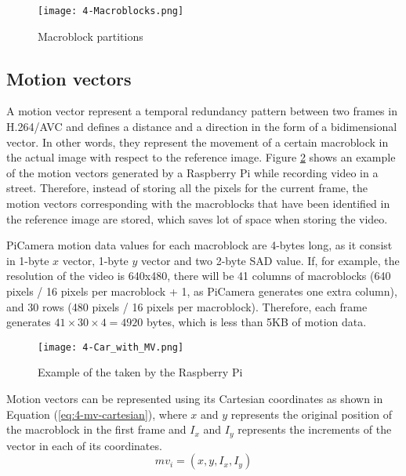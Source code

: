 \begin{figure}[!h]
	\begin{center}
		\texttt{[image: 4-Macroblocks.png]}
		\caption{Macroblock partitions}
		\label{fig:4-Macroblocks}
	\end{center}
\end{figure}


\subsection{Motion vectors}
A motion vector represent a temporal redundancy pattern between two frames in H.264/AVC and defines a distance and a direction in the form of a bidimensional vector. In other words, they represent the movement of a certain macroblock in the actual image with respect to the reference image. Figure \ref{fig:4-Car_with_MV} shows an example of the motion vectors generated by a Raspberry Pi while recording video in a street. Therefore, instead of storing all the pixels for the current frame, the motion vectors corresponding with the macroblocks that have been identified in the reference image are stored, which saves lot of space when storing the video.

PiCamera motion data values for each macroblock are 4-bytes long, as it consist in 1-byte $x$ vector, 1-byte $y$ vector and two 2-byte \ac{SAD} value. If, for example, the resolution of the video is 640x480, there will be 41 columns of macroblocks (640 pixels / 16 pixels per macroblock + 1, as PiCamera generates one extra column), and 30 rows (480 pixels / 16 pixels per macroblock). Therefore, each frame generates $41\times30\times4 = 4920$ bytes, which is less than 5KB of motion data.

\begin{figure}[!h]
	\begin{center}
		\texttt{[image: 4-Car\_with\_MV.png]}
		\caption{Example of  the  taken by the Raspberry Pi}
		\label{fig:4-Car_with_MV}
	\end{center}
\end{figure}

Motion vectors can be represented using its Cartesian coordinates as shown in Equation (\ref{eq:4-mv-cartesian}), where $x$ and $y$ represents the original position of the macroblock in the first frame and $I_{x}$ and $I_{y}$ represents the increments of the vector in each of its coordinates.
\begin{equation} \label{eq:4-mv-cartesian}
mv_{i} = (x, y, I_{x}, I_{y})
\end{equation}

